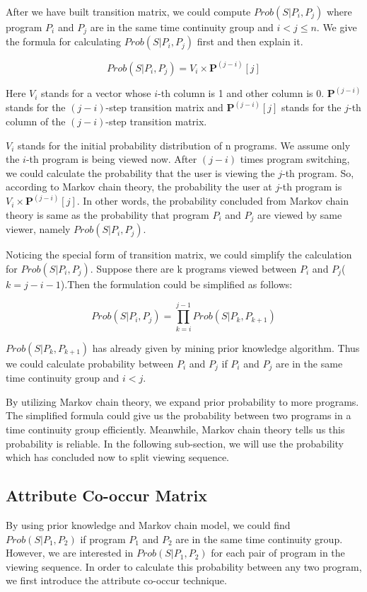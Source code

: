 After we have built transition matrix, we could compute $Prob(S|P_i,P_j)$ where program $P_i$ and $P_j$ are in the same time continuity
group and $i < j \leq n$. We give the formula for calculating $Prob(S|P_i,P_j)$ first and then explain it.

\begin{equation}
Prob(S|P_i, P_j) = V_i \times \boldsymbol{P}^{(j-i)}[j]
\end{equation}

Here $V_i$ stands for a vector whose $i$-th column is 1 and other column is 0. $\boldsymbol{P}^{(j-i)}$ stands for the $(j-i)$-step
transition matrix and $\boldsymbol{P}^{(j-i)}[j]$ stands for the $j$-th column of the $(j-i)$-step transition matrix.

$V_i$ stands for the initial probability distribution of n programs. We assume only the $i$-th program is being viewed now. After
$(j-i)$ times program switching, we could calculate the probability that the user is viewing the $j$-th program. So, according to
Markov chain theory, the probability the user at $j$-th program is $V_i \times \boldsymbol{P}^{(j-i)}[j]$. In other words, the
probability concluded from Markov chain theory is same as the probability that program $P_i$ and $P_j$ are viewed by same viewer,
namely $Prob(S|P_i,P_j)$.

Noticing the special form of transition matrix, we could simplify the calculation for $Prob(S|P_i,P_j)$. Suppose there are k programs
viewed between $P_i$ and $P_j$($k=j-i-1$).Then the formulation could be simplified as follows:

\begin{equation}
Prob(S|P_i,P_j)=\prod_{k=i}^{j-1}Prob(S|P_k,P_{k+1})
\end{equation}

$Prob(S|P_k,P_{k+1})$ has already given by mining prior knowledge algorithm. Thus we could calculate probability between $P_i$ and
$P_j$ if $P_i$ and $P_j$ are in the same time continuity group and $i<j$.

By utilizing Markov chain theory, we expand prior probability to more programs. The simplified formula could give us the probability
between two programs in a time continuity group efficiently. Meanwhile, Markov chain theory tells us this probability is reliable.
In the following sub-section, we will use the probability which has concluded now to split viewing sequence.

\subsection{Attribute Co-occur Matrix}
By using prior knowledge and Markov chain model, we could find $Prob(S|P_1,P_2)$ if program $P_1$ and $P_2$ are in the same time
continuity group. However, we are interested in $Prob(S|P_1,P_2)$ for each pair of program in the viewing sequence. In order to
calculate this probability between any two program, we first introduce the attribute co-occur
technique\cite{He:2006:ACS:1132863.1132872}\cite{4734002}\cite{4401042}.

